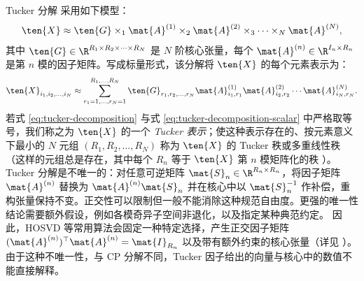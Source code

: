


Tucker 分解 \cite{tucker1966some} 采用如下模型：
\begin{equation}
\label{eq:tucker-decomposition}
\ten{X} \approx \ten{G}\times_1\mat{A}^{(1)}\times_2\mat{A}^{(2)} \times_3 \cdots \times_N\mat{A}^{(N)},
\end{equation}
其中 $\ten{G} \in \R^{R_1 \times R_2 \times \cdots \times R_N}$ 是 $N$ 阶核心张量，每个 $\mat{A}^{(n)} \in \R^{I_n \times R_n}$ 是第 $n$ 模的因子矩阵。写成标量形式，该分解将 $\ten{X}$ 的每个元素表示为：
\begin{equation}
\label{eq:tucker-decomposition-scalar}
\ten{X}_{i_1, i_2, \dots, i_N} \approx \sum_{r_1=1, \dots, r_N=1}^{R_1, \dots, R_N}
\ten{G}_{r_1, r_2, \dots, r_N} \mat{A}^{(1)}_{i_1, r_1} \mat{A}^{(2)}_{i_2, r_2} \cdots \mat{A}^{(N)}_{i_N, r_N}.
\end{equation}
若式 \eqref{eq:tucker-decomposition} 与式 \eqref{eq:tucker-decomposition-scalar} 中严格取等号，我们称之为 $\ten{X}$ 的一个 \emph{Tucker 表示}；使这种表示存在的、按元素意义下最小的 $N$ 元组 $(R_1, R_2, \dots, R_N)$ 称为 $\ten{X}$ 的 Tucker 秩或多重线性秩（这样的元组总是存在，其中每个 $R_n$ 等于 $\ten{X}$ 第 $n$ 模矩阵化的秩 \cite{kolda2009tensor}）。
Tucker 分解是不唯一的：对任意可逆矩阵 $\mat{S}_n \in \R^{R_n \times R_n}$，将因子矩阵 $\mat{A}^{(n)}$ 替换为 $\mat{A}^{(n)}\mat{S}_n$ 并在核心中以 $\mat{S}_n^{-1}$ 作补偿，重构张量保持不变。正交性可以限制但一般不能消除这种规范自由度。更强的唯一性结论需要额外假设，例如各模奇异子空间非退化，以及指定某种典范约定。
因此，HOSVD \cite{lathauwer2000hosvd} 等常用算法会固定一种特定选择，产生正交因子矩阵 $(\mat{A}^{(n)})^\top \mat{A}^{(n)} = \mat{I}_{R_n}$ 以及带有额外约束的核心张量（详见 \cite{lathauwer2000hosvd}）。
由于这种不唯一性，与 CP 分解不同，Tucker 因子给出的向量与核心中的数值不能直接解释。


